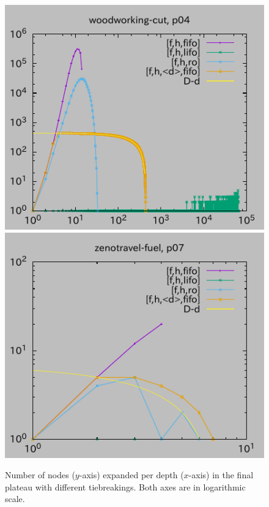 \begin{figure}[tb]
\includegraphics{img/depth/woodworking-cut/p04.pdf}
\includegraphics{img/depth/zenotravel-fuel/p07.pdf} %
 \caption{Number of nodes ($y$-axis) expanded per depth ($x$-axis) in
 the final plateau with different tiebreakings. Both axes are in logarithmic scale.
 }
 \label{fig:depth-histogram}
\end{figure}

